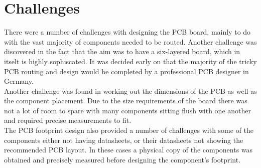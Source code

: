 
\section{Challenges}
\label{chap6sec7}

	There were a number of challenges with designing the PCB board, mainly to do with the vast majority of components needed to be routed. Another challenge was discovered in the fact that the aim was to have a six-layered board, which in itselt is highly sophiscated. It was decided early on that the majority of the tricky PCB routing and design would be completed by a professional PCB designer in Germany.\\
Another challenge was found in working out the dimensions of the PCB as well as the component placement. Due to the size requirements of the board there was not a lot of room to spare with many components sitting flush with one another and required precise measurements to fit. \\
The PCB footprint design also provided a number of challenges with some of the components either not having datasheets, or their datasheets not showing the recommended PCB layout. In these cases a physical copy of the components was obtained and precisely measured before designing the component's footprint.











